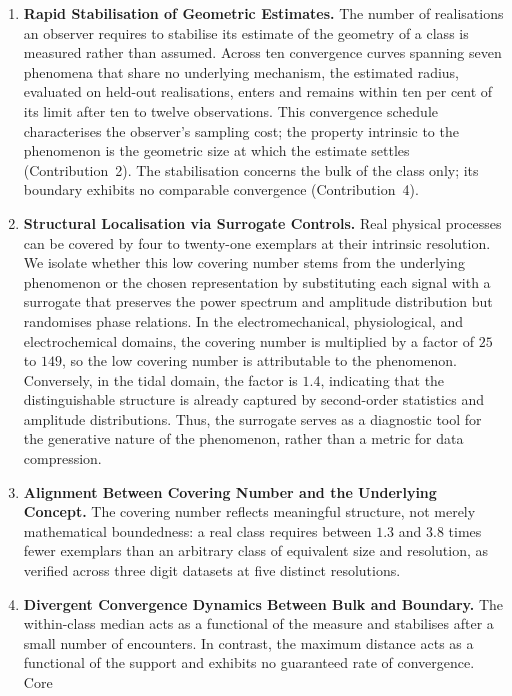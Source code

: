\documentclass[10pt]{article}
\theoremstyle{plain}
\theoremstyle{definition}
\theoremstyle{remark}
\begin{document}
\begin{enumerate}
  \item \textbf{Rapid Stabilisation of Geometric Estimates.} The number of
    realisations an observer requires to stabilise its estimate of the geometry of a class is measured
    rather than assumed. Across ten convergence curves spanning seven phenomena
    that share no underlying mechanism, the estimated radius, evaluated on held-out
    realisations, enters and remains within ten per cent of its limit after ten
    to twelve observations. This convergence schedule characterises the observer's sampling
    cost; the property intrinsic to the phenomenon is the geometric size at which the
    estimate settles (Contribution~2). The stabilisation concerns the bulk of the
    class only; its boundary exhibits no comparable convergence
    (Contribution~4).
  \item \textbf{Structural Localisation via Surrogate Controls.} Real physical
    processes can be covered by four to twenty-one exemplars at their intrinsic
    resolution. We isolate whether this low covering number stems from the underlying
    phenomenon or the chosen representation by substituting each signal with a
    surrogate that preserves the power spectrum and amplitude distribution but
    randomises phase relations. In the electromechanical, physiological, and
    electrochemical domains, the covering number is multiplied by a
    factor of $25$ to $149$, so the low covering number is attributable to the phenomenon. Conversely, in the tidal domain, the factor
    is $1.4$, indicating that the distinguishable structure
    is already captured by second-order statistics and amplitude distributions.
    Thus, the surrogate serves as a diagnostic tool for the generative nature of
    the phenomenon, rather than a metric for data compression.
  \item \textbf{Alignment Between Covering Number and the Underlying Concept.} The
    covering number reflects meaningful structure, not merely mathematical
    boundedness: a real class requires between $1.3$ and $3.8$
    times fewer exemplars than an arbitrary class of equivalent size and resolution,
    as verified across three digit datasets at five distinct resolutions.
  \item \textbf{Divergent Convergence Dynamics Between Bulk and Boundary.} The
    within-class median acts as a functional of the measure and stabilises after
    a small number of encounters. In contrast, the maximum distance acts as a
    functional of the support and exhibits no guaranteed rate of convergence. Core

\end{enumerate}
\end{document}
